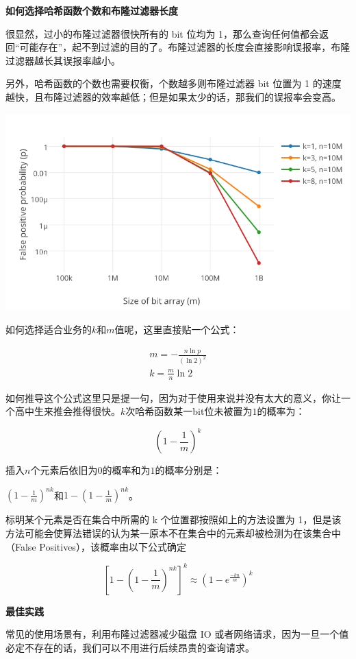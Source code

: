 \documentclass[cn,11pt,chinese]{elegantbook}
\begin{document}
\textbf{如何选择哈希函数个数和布隆过滤器长度}

很显然，过小的布隆过滤器很快所有的 bit 位均为
1，那么查询任何值都会返回``可能存在''，起不到过滤的目的了。布隆过滤器的长度会直接影响误报率，布隆过滤器越长其误报率越小。

另外，哈希函数的个数也需要权衡，个数越多则布隆过滤器 bit 位置为 1
的速度越快，且布隆过滤器的效率越低；但是如果太少的话，那我们的误报率会变高。

\includegraphics{images/bloomfilter.png}

如何选择适合业务的\(k\)和\(m\)值呢，这里直接贴一个公式：

\[
\begin{aligned}
m = - \frac{n \ln p}{(\ln 2)^2}
\\
k = \frac{m}{n} \ln 2
\end{aligned}
\]

如何推导这个公式这里只是提一句，因为对于使用来说并没有太大的意义，你让一个高中生来推会推得很快。\(k\)次哈希函数某一bit位未被置为\(1\)的概率为：

\[
(1 - \frac{1}{m})^k
\]

插入\(n\)个元素后依旧为\(0\)的概率和为\(1\)的概率分别是：

\((1 - \frac{1}{m})^{nk}\)和\(1-(1-\frac{1}{m})^{nk}\)。

标明某个元素是否在集合中所需的 k 个位置都按照如上的方法设置为
1，但是该方法可能会使算法错误的认为某一原本不在集合中的元素却被检测为在该集合中（False
Positives），该概率由以下公式确定

\[
[1-(1-\frac{1}{m})^{nk}]^k \approx (1 - e^{\frac{-kn}{m}})^k
\]

\textbf{最佳实践}

常见的使用场景有，利用布隆过滤器减少磁盘 IO
或者网络请求，因为一旦一个值必定不存在的话，我们可以不用进行后续昂贵的查询请求。
\end{document}
